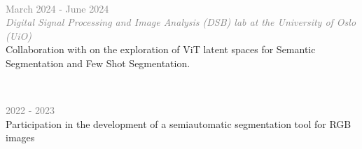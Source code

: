 

    
    


\\
\begin{small} \color{black}
\textcolor{gray}{March 2024 - June 2024\\ 
\textit{Digital Signal Processing and Image Analysis (DSB) lab at the University of Oslo (UiO)}} \\
Collaboration with  on the exploration of ViT latent spaces for Semantic Segmentation and Few Shot Segmentation.
\end{small}


\vspace{3mm}
\\
\begin{small} \color{black}
\textcolor{gray}{2022 - 2023}\\ 
Participation in the development of a semiautomatic segmentation tool for RGB images \\
\end{small}


